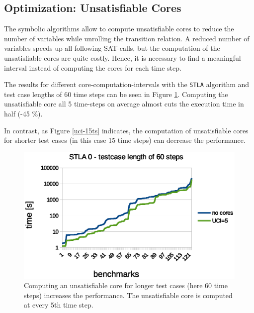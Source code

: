 \documentclass[a4paper,10pt]{article}
\begin{document}
\subsection{Optimization: Unsatisfiable Cores}
The symbolic algorithms allow to compute unsatisfiable cores to reduce the number of variables while unrolling the transition relation. A reduced number of variables speeds up all following SAT-calls,
but the computation of the unsatisfiable cores are quite costly. Hence, it is necessary to find a meaningful interval instead of computing the cores for each time step.

The results for different core-computation-intervals with the \texttt{STLA} algorithm and test case lengths of 60 time steps can be seen in Figure \ref{uci-30ts}. Computing the unsatisfiable core all 5 time-steps on average almost cuts
the execution time in half (-45 \%).

In contrast, as Figure \ref{uci-15ts} indicates, the computation of unsatisfiable cores for shorter test cases (in this case 15 time steps) can decrease the performance.

\begin{figure}[!htb]
\centering
\includegraphics[scale = 0.57]{img/uci-60ts.eps}
\centering \caption{Computing an unsatisfiable core for longer test cases (here 60 time steps) increases the performance. The unsatisfiable core is computed at every 5th time step.} 
\label{uci-30ts}
\end{figure}
\end{document}
